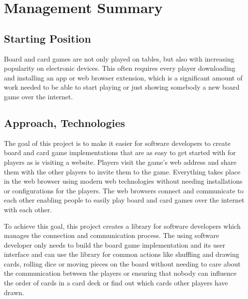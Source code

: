 % 

\chapter*{Management Summary}

\section*{Starting Position}

Board and card games are not only played on tables, but also with increasing
popularity on electronic devices. This often requires every player downloading
and installing an app or web browser extension, which is a significant amount of
work needed to be able to start playing or just showing somebody a new board
game over the internet.

\section*{Approach, Technologies}

The goal of this project is to make it easier for software developers to create
board and card game implementations that are as easy to get started with for
players as is visiting a website. Players visit the game's web address and share them
with the other players to invite them to the game. Everything takes place in the
web browser using modern web technologies without needing installations or
configurations for the players. The web browsers connect and communicate to each
other enabling people to easily play board and card games over the internet with
each other.

To achieve this goal, this project creates a library for software developers
which manages the connection and communication process. The using software
developer only needs to build the board game implementation and its user
interface and can use the library for common actions like shuffling and drawing
cards, rolling dice or moving pieces on the board without needing to care about
the communication between the players or ensuring that nobody can influence the
order of cards in a card deck or find out which cards other players have drawn.

